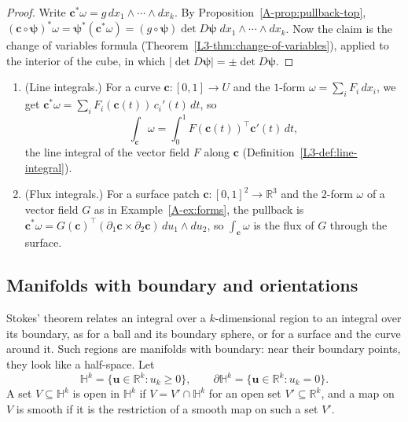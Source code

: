 \begin{proof}
    Write $\mathbf{c}^*\omega = g\, dx_1 \wedge \cdots \wedge dx_k$. By Proposition~\ref{A-prop:pullback-top}, $(\mathbf{c} \circ \boldsymbol{\psi})^*\omega = \boldsymbol{\psi}^*(\mathbf{c}^*\omega) = (g \circ \boldsymbol{\psi})\det D\boldsymbol{\psi}\; dx_1 \wedge \cdots \wedge dx_k$. Now the claim is the change of variables formula (Theorem~\ref{L3-thm:change-of-variables}), applied to the interior of the cube, in which $|\det D\boldsymbol{\psi}| = \pm\det D\boldsymbol{\psi}$.
\end{proof}

\begin{example}\label{A-ex:form-integrals}
    \begin{enumerate}
        \item (Line integrals.) For a curve $\mathbf{c}: [0, 1] \to U$ and the $1$-form $\omega = \sum_i F_i\, dx_i$, we get $\mathbf{c}^*\omega = \sum_i F_i(\mathbf{c}(t))\, c_i'(t)\, dt$, so
        \[\int_{\mathbf{c}} \omega = \int_0^1 F(\mathbf{c}(t))^\top\mathbf{c}'(t)\, dt,\]
        the line integral of the vector field $F$ along $\mathbf{c}$ (Definition~\ref{L3-def:line-integral}).
        \item (Flux integrals.) For a surface patch $\mathbf{c}: [0, 1]^2 \to \mathbb{R}^3$ and the $2$-form $\omega$ of a vector field $G$ as in Example~\ref{A-ex:forms}, the pullback is $\mathbf{c}^*\omega = G(\mathbf{c})^\top(\partial_1\mathbf{c} \times \partial_2\mathbf{c})\, du_1 \wedge du_2$, so $\int_{\mathbf{c}} \omega$ is the flux of $G$ through the surface.
    \end{enumerate}
\end{example}

\subsection{Manifolds with boundary and orientations}

Stokes' theorem relates an integral over a $k$-dimensional region to an integral over its boundary, as for a ball and its boundary sphere, or for a surface and the curve around it. Such regions are manifolds with boundary: near their boundary points, they look like a half-space. Let
\[\mathbb{H}^k = \{\mathbf{u} \in \mathbb{R}^k : u_k \geq 0\}, \qquad \partial\mathbb{H}^k = \{\mathbf{u} \in \mathbb{R}^k : u_k = 0\}.\]
A set $V \subseteq \mathbb{H}^k$ is open in $\mathbb{H}^k$ if $V = V' \cap \mathbb{H}^k$ for an open set $V' \subseteq \mathbb{R}^k$, and a map on $V$ is smooth if it is the restriction of a smooth map on such a set $V'$.

